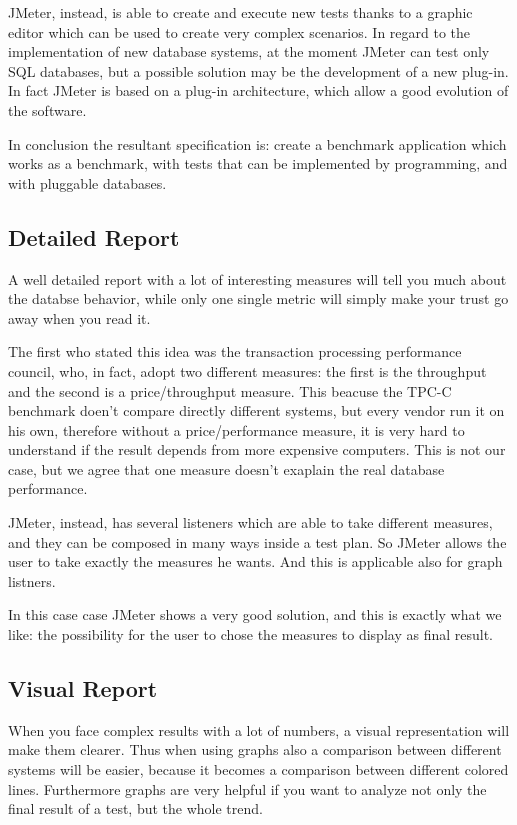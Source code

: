 JMeter, instead, is able to create and execute new tests thanks to a graphic editor which can be used to create very complex scenarios. In regard to the implementation of new database systems, at the moment JMeter can test only SQL databases, but a possible solution may be the development of a new plug-in. In fact JMeter is based on a plug-in architecture, which allow a good evolution of the software.

In conclusion the resultant specification is: create a benchmark application which works as a benchmark, with tests that can be implemented by programming, and with pluggable databases.
			 
		\subsection{Detailed Report} 
A well detailed report with a lot of interesting measures will tell you much about the databse behavior, while only one single metric will simply make your trust go away when you read it. 

The first who stated this idea was the transaction processing performance council, who, in fact, adopt two different measures: the first is the throughput and the second is a price/throughput measure. This beacuse the TPC-C benchmark doen't compare directly different systems, but every vendor run it on his own, therefore without a price/performance measure, it is very hard to understand if the result depends from more expensive computers. This is not our case, but we agree that one measure doesn't exaplain the real database performance.

JMeter, instead, has several listeners which are able to take different measures, and they can be composed in many ways inside a test plan. So JMeter allows the user to take exactly the measures he wants. And this is applicable also for graph listners.

In this case case JMeter shows a very good solution, and this is exactly what we like: the possibility for the user to chose the measures to display as final result.
			
		\subsection{Visual Report}
When you face complex results with a lot of numbers, a visual representation will make them clearer. Thus when using graphs also a comparison between different systems will be easier, because it becomes a comparison between different colored lines. Furthermore graphs are very helpful if you want to analyze not only the final result of a test, but the whole trend.

